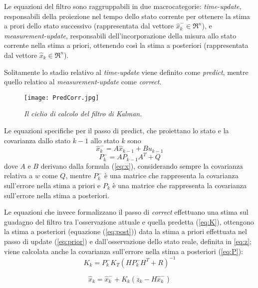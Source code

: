 Le equazioni del filtro sono raggruppabili in due macrocategorie: \textit{time-update}, responsabili della proiezione nel tempo dello stato corrente per ottenere la stima a prori dello stato successivo (rappresentata dal vettore $\hat{x}_k^- \in \Re^n$), e \textit{measurement-update}, responsabili dell'incorporazione della misura allo stato corrente nella stima a priori, ottenendo così la stima a posteriori (rappresentata dal vettore $\hat{x}_k \in \Re^n$). 

Solitamente lo stadio relativo al \textit{time-update} viene definito come \textit{predict}, mentre quello relatico al \textit{measurement-update} come \textit{correct}.

\begin{figure}[hb]
\centering
	\texttt{[image: PredCorr.jpg]}
\caption[Processo di predict/correct]{\textit{Il ciclio di calcolo del filtro di Kalman.}\label{fig:predictcorrect}}
\end{figure}

Le equazioni specifiche per il passo di predict, che proiettano lo stato e la covarianza dallo stato $k-1$ allo stato $k$ sono 
\begin{equation}\label{eq:prior}
\hat{x}_k^-=A \hat{x}_{k-1}+Bu_{k-1}
\end{equation} 
\begin{equation}
P_k^-=A P_{k-1}A^T+Q
\end{equation} 
dove $A$ e $B$ derivano dalla formula (\ref{eq:x}), considerando sempre la covarianza relativa a $w$ come $Q$, mentre $P_k^-$ è una matrice che rappresenta la covarianza sull'errore nella stima a priori e $P_k$ è una matrice che rappresenta la covarianza sull'errore nella stima a posteriori.

Le equazioni che invece formalizzano il passo di \textit{correct} effettuano una stima sul guadagno del filtro tra l'osservazione attuale e quella predetta (\ref{eq:K}), ottengono la stima a posteriori  (equazione (\ref{eq:post})) data la stima a priori effettuata nel passo di update (\ref{eq:prior}) e dall'osservazione dello stato reale, definita in \ref{eq:z}; viene calcolata anche la covarianza sull'errore nella stima a posteriori (\ref{eq:P}):
\begin{equation}\label{eq:K}
K_k = P_k^- K_T(HP_k^-H^T+R)^{-1}
\end{equation} 

\begin{equation}\label{eq:post}
\hat{x}_k=\hat{x}_k^-+K_k(z_k-H\hat{x}_k^-)
\end{equation} 

